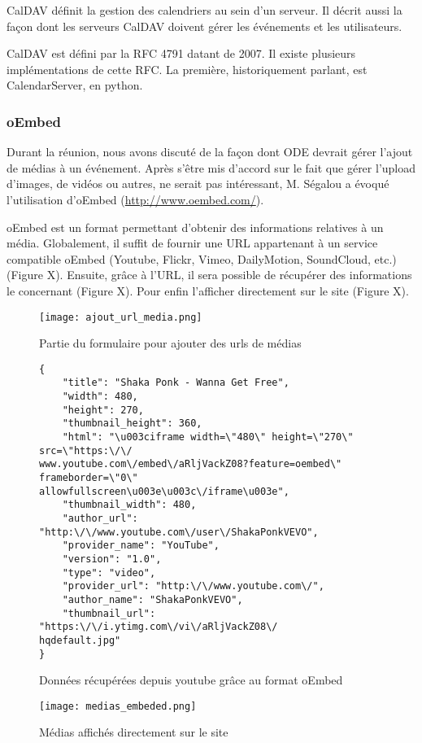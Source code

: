 CalDAV définit la gestion des calendriers au sein d'un serveur. Il décrit aussi la façon dont les serveurs CalDAV doivent gérer les événements et les utilisateurs.

CalDAV est défini par la RFC 4791 datant de 2007. Il existe plusieurs implémentations de cette RFC. La première, historiquement parlant, est CalendarServer, en python.

\subsubsection*{oEmbed}

Durant la réunion, nous avons discuté de la façon dont ODE devrait gérer l'ajout de médias à un événement. Après s'être mis d'accord sur le fait que gérer l'upload d'images, de vidéos ou autres, ne serait pas intéressant, M. Ségalou a évoqué l'utilisation d'oEmbed (\url{http://www.oembed.com/}).

oEmbed est un format permettant d'obtenir des informations relatives à un média. Globalement, il suffit de fournir une URL appartenant à un service compatible oEmbed (Youtube, Flickr, Vimeo, DailyMotion, SoundCloud, etc.) (Figure X). Ensuite, grâce à l'URL, il sera possible de récupérer des informations le concernant (Figure X). Pour enfin l'afficher directement sur le site (Figure X).

\newpage

\begin{figure}[H]
\begin{center}
\texttt{[image: ajout\_url\_media.png]}
\end{center}
\caption{Partie du formulaire pour ajouter des urls de médias}
\end{figure}


\begin{figure}[H]
\begin{lstlisting}[frame=single]
{
    "title": "Shaka Ponk - Wanna Get Free", 
    "width": 480, 
    "height": 270, 
    "thumbnail_height": 360, 
    "html": "\u003ciframe width=\"480\" height=\"270\" src=\"https:\/\/
www.youtube.com\/embed\/aRljVackZ08?feature=oembed\" frameborder=\"0\" 
allowfullscreen\u003e\u003c\/iframe\u003e", 
    "thumbnail_width": 480, 
    "author_url": "http:\/\/www.youtube.com\/user\/ShakaPonkVEVO", 
    "provider_name": "YouTube", 
    "version": "1.0", 
    "type": "video", 
    "provider_url": "http:\/\/www.youtube.com\/", 
    "author_name": "ShakaPonkVEVO", 
    "thumbnail_url": "https:\/\/i.ytimg.com\/vi\/aRljVackZ08\/
hqdefault.jpg"
}
\end{lstlisting}
\caption{Données récupérées depuis youtube grâce au format oEmbed}
\end{figure}

\begin{figure}[H]
\begin{center}
\texttt{[image: medias\_embeded.png]}
\end{center}
\caption{Médias affichés directement sur le site}
\end{figure}